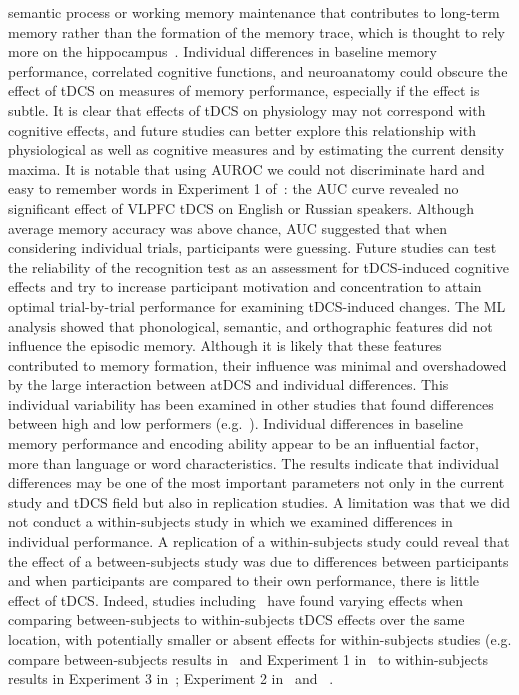 \documentclass[10pt,letterpaper]{article}
\begin{document}
semantic process or working memory maintenance that contributes to long-term memory rather than the formation of the memory trace, which is thought to rely more on the hippocampus~\cite{olsen2012hippocampus,staresina2009mind}. Individual differences in baseline memory performance, correlated cognitive functions, and neuroanatomy could obscure the effect of tDCS on measures of memory performance, especially if the effect is subtle. It is clear that effects of tDCS on physiology may not correspond with cognitive effects, and future studies can better explore this relationship with physiological as well as cognitive measures and by estimating the current density maxima. 
It is notable that using AUROC we could not discriminate  hard and easy to remember words in Experiment 1 of~\cite{medvedeva2019effects}: the AUC curve revealed no significant effect of VLPFC tDCS on English or Russian speakers. Although average memory accuracy was above chance, AUC suggested that when considering individual trials, participants were guessing. Future studies can test the reliability of the recognition test as an assessment for tDCS-induced cognitive effects and try to increase participant motivation and concentration to attain optimal trial-by-trial performance for examining tDCS-induced changes. The ML analysis showed that phonological, semantic, and orthographic features did not influence the episodic memory. Although it is likely that these features contributed to memory formation, their influence was minimal and overshadowed by the large interaction between atDCS and individual differences. This individual variability has been examined in other studies that found differences between high and low performers (e.g.~\cite{habich2017anodal}). Individual differences in baseline memory performance and encoding ability appear to be an influential factor, more than language or word characteristics. The results indicate that individual differences may be one of the most important parameters not only in the current study and tDCS field but also in replication studies. A limitation was that we did not conduct a within-subjects study in which we examined differences in individual performance. A replication of a within-subjects study could reveal that the effect of a between-subjects study was due to differences between participants and when participants are compared to their own performance, there is little effect of tDCS. Indeed, studies including~\cite{medvedeva2019effects} have found varying effects when comparing between-subjects to within-subjects tDCS effects over the same location, with potentially smaller or absent effects for within-subjects studies (e.g. compare between-subjects results in~\cite{sandrini2014noninvasive,
gray2015electrically,matzen2015effects,pisoni2015guess}  and Experiment 1 in~\cite{medvedeva2019effects} to within-subjects results in Experiment 3 in~\cite{medvedeva2019effects}; Experiment 2 in~\cite{smirni2015modulating} and ~\cite{manenti2013enhancing}.
\end{document}
